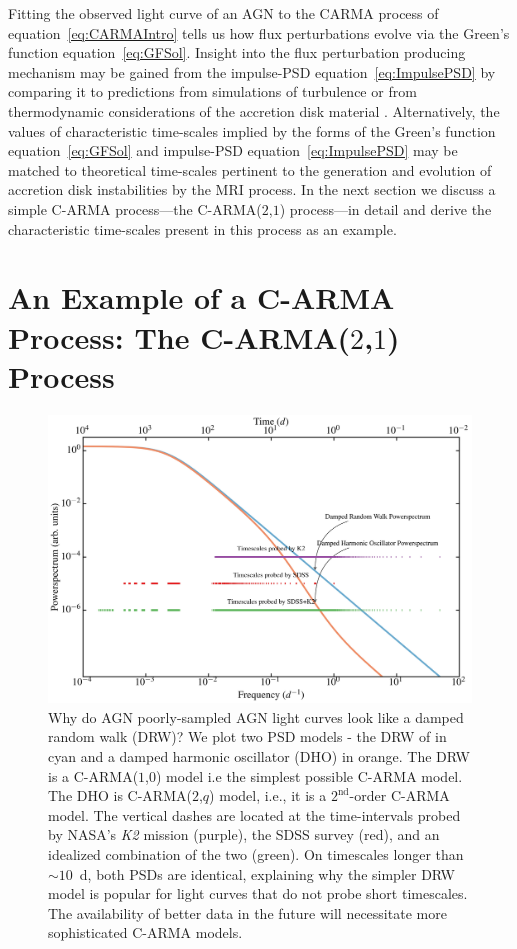 \documentclass[a4paper,fleqn,usenatbib]{mnras}
\begin{document}
Fitting the observed light curve of an AGN to the CARMA process of equation~\eqref{eq:CARMAIntro} tells us how flux perturbations evolve via the Green's function equation~\eqref{eq:GFSol}. Insight into the flux perturbation producing mechanism may be gained from the impulse-PSD equation~\eqref{eq:ImpulsePSD} by comparing it to predictions from simulations of turbulence \citep{EddySim15} or from thermodynamic considerations of the accretion disk material \citep{Mellen52}. Alternatively, the values of characteristic time-scales implied by the forms of the Green's function equation~\eqref{eq:GFSol} and impulse-PSD equation~\eqref{eq:ImpulsePSD} may be matched to theoretical time-scales pertinent to the generation and evolution of accretion disk instabilities by the MRI process. In the next section we discuss a simple C-ARMA process---the C-ARMA($2$,$1$) process---in detail and derive the characteristic time-scales present in this process as an example.

\section[C-ARMA($2$,$1$)]{An Example of a C-ARMA Process: The C-ARMA($2$,$1$) Process}\label{sec:CARMA21}

\begin{figure}
    \includegraphics[width=\textwidth]{images/PowerOfSDSSK2.jpg}
    \caption{Why do AGN poorly-sampled AGN light curves look like a damped random walk (DRW)? We plot two PSD models - the DRW of \citet{Kelly09} in cyan and a damped harmonic oscillator (DHO) in orange. The DRW is a C-ARMA($1$,$0$) model i.e  the simplest possible C-ARMA model. The DHO is C-ARMA($2$,$q$) model, i.e., it is a $2^{\text{nd}}$-order C-ARMA model. The vertical dashes are located at the time-intervals probed by NASA's \textit{K2} mission (purple), the SDSS survey (red), and an idealized combination of the two (green). On timescales longer than $\sim 10$~d, both PSDs are identical, explaining why the simpler DRW model is popular for light curves that do not probe short timescales. The availability of better data in the future will necessitate more sophisticated C-ARMA models.}
    \label{fig:PowerOfSDSSK2}
\end{figure}
\end{document}
